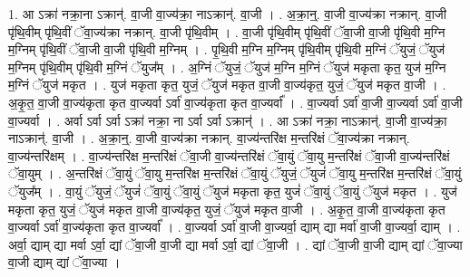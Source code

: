 \documentclass[17pt]{extarticle}
\begin{document}
1. आ ऽक्रा॑ नक्रा॒ना ऽक्रान्॑. वा॒जी वा॒ज्य॑क्रा॒ नाऽक्रान्॑. वा॒जी । . अ॒क्रा॒न्॒. वा॒जी वा॒ज्य॑क्रा नक्रान्. वा॒जी पृ॑थि॒वीम् पृ॑थि॒वीं ॅवा॒ज्य॑क्रा नक्रान्. वा॒जी पृ॑थि॒वीम् । . वा॒जी पृ॑थि॒वीम् पृ॑थि॒वीं ॅवा॒जी वा॒जी पृ॑थि॒वी म॒ग्नि म॒ग्निम् पृ॑थि॒वीं ॅवा॒जी वा॒जी पृ॑थि॒वी म॒ग्निम् । . पृ॒थि॒वी म॒ग्नि म॒ग्निम् पृ॑थि॒वीम् पृ॑थि॒वी म॒ग्निं ॅयुजं॒ ॅयुज॑ म॒ग्निम् पृ॑थि॒वीम् पृ॑थि॒वी म॒ग्निं ॅयुज᳚म् । . अ॒ग्निं ॅयुजं॒ ॅयुज॑ म॒ग्नि म॒ग्निं ॅयुज॑ मकृता कृत॒ युज॑ म॒ग्नि म॒ग्निं ॅयुज॑ मकृत । . युज॑ मकृता कृत॒ युजं॒ ॅयुज॑ मकृत वा॒जी वा॒ज्य॑कृत॒ युजं॒ ॅयुज॑ मकृत वा॒जी । . अ॒कृ॒त॒ वा॒जी वा॒ज्य॑कृता कृत वा॒ज्यर्वा ऽर्वा॑ वा॒ज्य॑कृता कृत वा॒ज्यर्वा᳚ । . वा॒ज्यर्वा ऽर्वा॑ वा॒जी वा॒ज्यर्वा ऽर्वा॑ वा॒जी वा॒ज्यर्वा । . अर्वा ऽर्वा ऽर्वा ऽक्रा॑ नक्रा॒ ना ऽर्वा ऽर्वा ऽक्रान्॑ । . आ ऽक्रा॑ नक्रा॒ नाऽक्रान्॑. वा॒जी वा॒ज्य॑क्रा॒ नाऽक्रान्॑. वा॒जी । . अ॒क्रा॒न्॒. वा॒जी वा॒ज्य॑क्रा नक्रान्. वा॒ज्य॑न्तरि॑क्ष म॒न्तरि॑क्षं ॅवा॒ज्य॑क्रा नक्रान्. वा॒ज्य॑न्तरि॑क्षम् । . वा॒ज्य॑न्तरि॑क्ष म॒न्तरि॑क्षं ॅवा॒जी वा॒ज्य॑न्तरि॑क्षं ॅवा॒युं ॅवा॒यु म॒न्तरि॑क्षं ॅवा॒जी वा॒ज्य॑न्तरि॑क्षं ॅवा॒युम् । . अ॒न्तरि॑क्षं ॅवा॒युं ॅवा॒यु म॒न्तरि॑क्ष म॒न्तरि॑क्षं ॅवा॒युं ॅयुजं॒ ॅयुजं॑ ॅवा॒यु म॒न्तरि॑क्ष म॒न्तरि॑क्षं ॅवा॒युं ॅयुज᳚म् । . वा॒युं ॅयुजं॒ ॅयुजं॑ ॅवा॒युं ॅवा॒युं ॅयुज॑ मकृता कृत॒ युजं॑ ॅवा॒युं ॅवा॒युं ॅयुज॑ मकृत । . युज॑ मकृता कृत॒ युजं॒ ॅयुज॑ मकृत वा॒जी वा॒ज्य॑कृत॒ युजं॒ ॅयुज॑ मकृत वा॒जी । . अ॒कृ॒त॒ वा॒जी वा॒ज्य॑कृता कृत वा॒ज्यर्वा ऽर्वा॑ वा॒ज्य॑कृता कृत वा॒ज्यर्वा᳚ । . वा॒ज्यर्वा ऽर्वा॑ वा॒जी वा॒ज्यर्वा॒ द्याम् द्या मर्वा॑ वा॒जी वा॒ज्यर्वा॒ द्याम् । . अर्वा॒ द्याम् द्या मर्वा ऽर्वा॒ द्यां ॅवा॒जी वा॒जी द्या मर्वा ऽर्वा॒ द्यां ॅवा॒जी । . द्यां ॅवा॒जी वा॒जी द्याम् द्यां ॅवा॒ज्या वा॒जी द्याम् द्यां ॅवा॒ज्या । \newline
\end{document}
